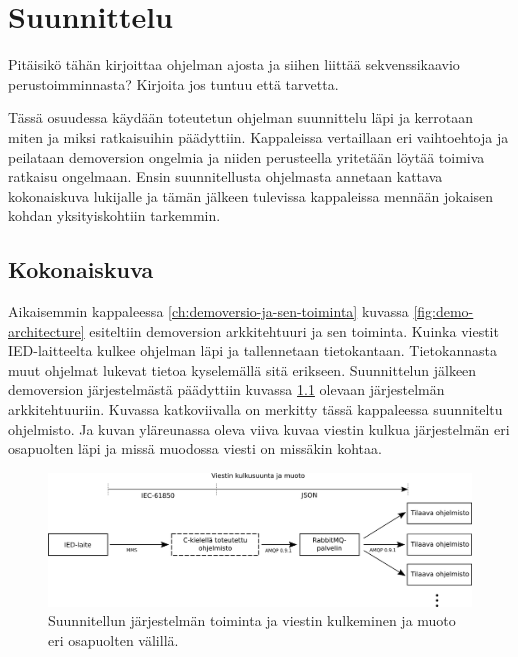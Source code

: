 \chapter{Suunnittelu}
\label{ch:suunnittelu}
\begin{it}
	Pitäisikö tähän kirjoittaa ohjelman ajosta ja siihen liittää sekvenssikaavio perustoimminnasta? Kirjoita jos tuntuu että tarvetta.
\end{it}
Tässä osuudessa käydään toteutetun ohjelman suunnittelu läpi ja kerrotaan miten ja miksi ratkaisuihin päädyttiin. Kappaleissa vertaillaan eri vaihtoehtoja ja peilataan demoversion ongelmia ja niiden perusteella yritetään löytää toimiva ratkaisu ongelmaan. Ensin suunnitellusta ohjelmasta annetaan kattava kokonaiskuva lukijalle ja tämän jälkeen tulevissa kappaleissa mennään jokaisen kohdan yksityiskohtiin tarkemmin.


\section{Kokonaiskuva}
Aikaisemmin kappaleessa \ref{ch:demoversio-ja-sen-toiminta} kuvassa \ref{fig:demo-architecture} esiteltiin demoversion arkkitehtuuri ja sen toiminta. Kuinka viestit IED-laitteelta kulkee ohjelman läpi ja tallennetaan tietokantaan. Tietokannasta muut ohjelmat lukevat tietoa kyselemällä sitä erikseen. Suunnittelun jälkeen demoversion järjestelmästä päädyttiin kuvassa \ref{fig:planned-system-architecture} olevaan järjestelmän arkkitehtuuriin. Kuvassa katkoviivalla on merkitty tässä kappaleessa suunniteltu ohjelmisto. Ja kuvan yläreunassa oleva viiva kuvaa viestin kulkua järjestelmän eri osapuolten läpi ja missä muodossa viesti on missäkin kohtaa.

\begin{figure}[ht!]
	\includegraphics[width=1\textwidth]{pictures/planned-system-architecture.png}
	\caption{Suunnitellun järjestelmän toiminta ja viestin kulkeminen ja muoto eri osapuolten välillä.}
	\label{fig:planned-system-architecture}
\end{figure}

